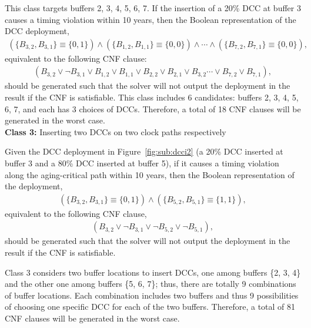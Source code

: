 This class targets buffers 2, 3, 4, 5, 6, 7. If the insertion of a 20\% DCC at buffer 3 causes a timing violation within 10 years, then the Boolean representation of the DCC deployment, 
{\fontsize{9}{10}
\begin{gather*}
	\left(\{B_{3,2}, B_{3,1}\} \equiv \{0, 1\} \right) \land \left( \{B_{1,2}, B_{1,1}\} \equiv \{0, 0\} \right) \land \dotsb 
	\land \left( \{B_{7,2}, B_{7,1}\} \equiv \{0, 0\} \right),
\end{gather*}}equivalent to the following CNF clause:
{\fontsize{9}{10}
\begin{gather*}
	(B_{3,2} \lor \neg B_{3,1} \lor B_{1,2} \lor B_{1,1} \lor B_{2,2} \lor B_{2,1} \lor B_{3,2} \dotsb  
\lor B_{7,2} \lor B_{7,1}),
\end{gather*}}should be generated such that the solver will not output the deployment in the result if the CNF is satisfiable. This class includes 6 candidates: buffers 2, 3, 4, 5, 6, 7, and each has 3 choices of DCCs. Therefore, a total of 18 CNF clauses will be generated in the worst case.\\


\noindent \textbf{Class 3:} Inserting two DCCs on two clock paths respectively

Given the DCC deployment in Figure~\ref{fig:sub:dcci2} (a 20\% DCC inserted at buffer 3 and a 80\% DCC inserted at buffer 5), if it causes a timing violation along the aging-critical path within 10 years, then the Boolean representation of the deployment,
{\fontsize{9}{10}
\begin{gather*}
\left(\{B_{3,2}, B_{3,1}\} \equiv \{0, 1\} \right) \land \left( \{B_{5,2}, B_{5,1}\} \equiv \{1, 1\} \right),
\end{gather*}}equivalent to the following CNF clause,
{\fontsize{9}{10}
\begin{gather*}
\left(B_{3,2} \lor \neg B_{3,1} \lor \neg B_{5,2} \lor \neg B_{5,1} \right), 
\end{gather*}}should be generated such that the solver will not output the deployment in the result if the CNF is satisfiable.

Class 3 considers two buffer locations to insert DCCs, one among buffers \{2, 3, 4\} and the other one among buffers \{5, 6, 7\}; thus, there are totally 9 combinations of buffer locations. Each combination includes two buffers and thus 9 possibilities of choosing one specific DCC for each of the two buffers. Therefore, a total of 81 CNF clauses will be generated in the worst case.

